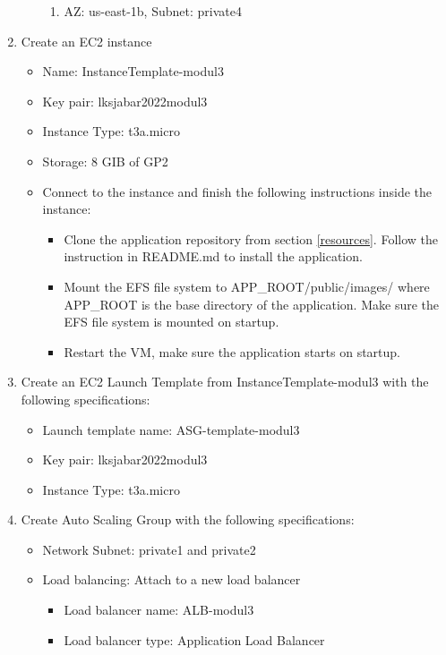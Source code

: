 \documentclass{article}
\begin{document}
\begin{enumerate}
\begin{itemize}
\begin{enumerate}
            \item AZ: us-east-1b, Subnet: private4
        \end{enumerate}
    \end{itemize}
    \item Create an EC2 instance
    \begin{itemize}
        \item Name: InstanceTemplate-modul3
        \item Key pair: lksjabar2022modul3
        \item Instance Type: t3a.micro
        \item Storage: 8 GIB of GP2
        \item Connect to the instance and finish the following instructions inside the instance:
        \begin{itemize}
            \item Clone the application repository from section \ref{resources}. Follow the instruction in README.md to install the application.
            \item Mount the EFS file system to APP\_ROOT/public/images/ where APP\_ROOT is the base directory of the application. Make sure the EFS file system is mounted on startup.
            \item Restart the VM, make sure the application starts on startup.
        \end{itemize}
    \end{itemize}
    \item Create an EC2 Launch Template from InstanceTemplate-modul3 with the following specifications:
    \begin{itemize}
        \item Launch template name: ASG-template-modul3
        \item Key pair: lksjabar2022modul3
        \item Instance Type: t3a.micro
    \end{itemize}
    \item Create Auto Scaling Group with the following specifications:
    \begin{itemize}
        \item Network Subnet: private1 and private2
        \item Load balancing: Attach to a new load balancer
        \begin{itemize}
            \item Load balancer name: ALB-modul3
            \item Load balancer type: Application Load Balancer

\end{itemize}
\end{itemize}
\end{enumerate}
\end{document}
